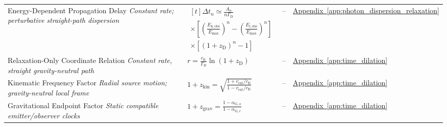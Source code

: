 \begin{longtable}{@{} p{4.5cm} p{6cm} c p{4cm} @{}}
{\raggedright Energy-Dependent Propagation Delay \newline \textit{Constant rate; perturbative straight-path dispersion}\par} & {\raggedright $\begin{gathered}[t]\Delta t_n\simeq\frac{A_n}{n\Gamma_{\mathrm D}} \\ \times\left[\left(\frac{E_{\mathrm{h,obs}}}{E_{\max}}\right)^n-\left(\frac{E_{\mathrm{l,obs}}}{E_{\max}}\right)^n\right] \\ \times[(1+z_{\mathrm D})^n-1]\end{gathered}$\par} & -- & {\raggedright \hyperref[app:photon_dispersion_relaxation]{Appendix~\ref*{app:photon_dispersion_relaxation}}\par} \\

{\raggedright Relaxation-Only Coordinate Relation \newline \textit{Constant rate, straight gravity-neutral path}\par} & {\raggedright $r = \frac{c_{\mathrm{E}}}{\Gamma_{\mathrm{D}}}\ln(1+z_{\mathrm{D}})$\par} & -- & {\raggedright \hyperref[app:time_dilation]{Appendix~\ref*{app:time_dilation}}\par} \\

{\raggedright Kinematic Frequency Factor \newline \textit{Radial source motion; gravity-neutral local frame}\par} & {\raggedright $1+z_{\mathrm{kin}}=\sqrt{\frac{1+v_{\mathrm{ext}}/c_{\mathrm E}}{1-v_{\mathrm{ext}}/c_{\mathrm E}}}$\par} & -- & {\raggedright \hyperref[app:time_dilation]{Appendix~\ref*{app:time_dilation}}\par} \\

{\raggedright Gravitational Endpoint Factor \newline \textit{Static compatible emitter/observer clocks}\par} & {\raggedright $1+z_{\mathrm{grav}}=\frac{1-\alpha_{\mathrm G,o}}{1-\alpha_{\mathrm G,e}}$\par} & -- & {\raggedright \hyperref[app:time_dilation]{Appendix~\ref*{app:time_dilation}}\par} \\


\end{longtable}
